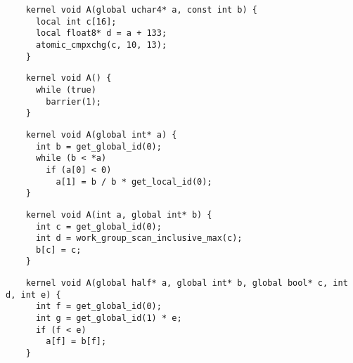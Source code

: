 \newsavebox{\NvidiaLocalSegfault}
\begin{lrbox}{\NvidiaLocalSegfault}
  \hspace{1.5em}
  \begin{lstlisting}
    kernel void A(global uchar4* a, const int b) {
      local int c[16];
      local float8* d = a + 133;
      atomic_cmpxchg(c, 10, 13);
    }
  \end{lstlisting}
\end{lrbox}


\newsavebox{\IntelPostDominanceFrontier}
\begin{lrbox}{\IntelPostDominanceFrontier}
  \hspace{1.5em}
  \begin{lstlisting}
    kernel void A() {
      while (true)
        barrier(1);
    }
  \end{lstlisting}
\end{lrbox}
%
%

\newsavebox{\IntelPredicator}
\begin{lrbox}{\IntelPredicator}
  \hspace{1.5em}
  \begin{lstlisting}
    kernel void A(global int* a) {
      int b = get_global_id(0);
      while (b < *a)
        if (a[0] < 0)
          a[1] = b / b * get_local_id(0);
    }
  \end{lstlisting}
\end{lrbox}

\newsavebox{\IntelPrepareKernelArgs}
\begin{lrbox}{\IntelPrepareKernelArgs}
  \hspace{1.5em}
  \begin{lstlisting}
    kernel void A(int a, global int* b) {
      int c = get_global_id(0);
      int d = work_group_scan_inclusive_max(c);
      b[c] = c;
    }
  \end{lstlisting}
\end{lrbox}

\newsavebox{\IntelDAGInstrSelection}
\begin{lrbox}{\IntelDAGInstrSelection}
  \hspace{1.5em}
  \begin{lstlisting}
    kernel void A(global half* a, global int* b, global bool* c, int d, int e) {
      int f = get_global_id(0);
      int g = get_global_id(1) * e;
      if (f < e)
        a[f] = b[f];
    }
  \end{lstlisting}
\end{lrbox}

